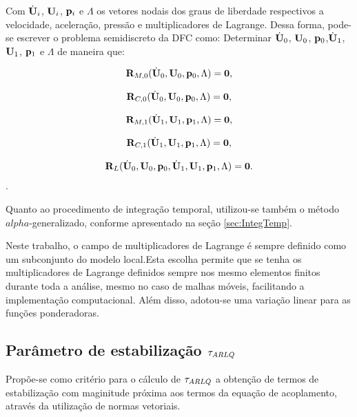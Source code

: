 \documentclass[tese_patricia]{subfiles}
\begin{document}
Com $\dot{\mathbf{U}}_{i}$, $\mathbf{U}_{i}$, $\mathbf{p}_i$ e $\Lambda$ os vetores nodais dos graus de liberdade respectivos a velocidade, aceleração, pressão e multiplicadores de Lagrange. Dessa forma, pode-se escrever o problema semidiscreto da DFC como: Determinar $\dot{\mathbf{U}}_0$, $\mathbf{U}_0$, $\mathbf{p}_0$,$\dot{\mathbf{U}}_1$, $\mathbf{U}_1$, $\mathbf{p}_1$ e $\Lambda$ de maneira que:

\begin{align}
	\mathbf{R}_{M,0}(\dot{\mathbf{U}}_0,\mathbf{U}_0,\mathbf{p}_0,\Lambda) = \mathbf{0},
\end{align}

\begin{align}
	\mathbf{R}_{C,0}(\dot{\mathbf{U}}_0,\mathbf{U}_0,\mathbf{p}_0,\Lambda) = \mathbf{0},
\end{align}

\begin{align}
	\mathbf{R}_{M,1}(\dot{\mathbf{U}}_1,\mathbf{U}_1,\mathbf{p}_1,\Lambda) = \mathbf{0},
\end{align}

\begin{align}
	\mathbf{R}_{C,1}(\dot{\mathbf{U}}_1,\mathbf{U}_1,\mathbf{p}_1,\Lambda) = \mathbf{0},
\end{align}

\begin{align}
	\mathbf{R}_{L}(\dot{\mathbf{U}}_0,\mathbf{U}_0,\mathbf{p}_0,\dot{\mathbf{U}}_1,\mathbf{U}_1,\mathbf{p}_1,\Lambda) = \mathbf{0}.
\end{align}.

Quanto ao procedimento de integração temporal, utilizou-se também o método $alpha$-generalizado, conforme apresentado na seção \ref{sec:IntegTemp}.

Neste trabalho, o campo de multiplicadores de Lagrange é sempre definido como um subconjunto do modelo local.Esta escolha permite que se tenha os multiplicadores de Lagrange definidos sempre nos mesmo elementos finitos durante toda a análise, mesmo no caso de malhas móveis, facilitando a implementação computacional. Além disso, adotou-se uma variação linear para as funções ponderadoras.



\subsection{Parâmetro de estabilização $\tau_{ARLQ}$}

Propõe-se como critério para o cálculo de $\tau_{ARLQ}$ a obtenção de termos de estabilização com maginitude próxima aos termos da equação de acoplamento, através da utilização de normas vetoriais. 
\end{document}
